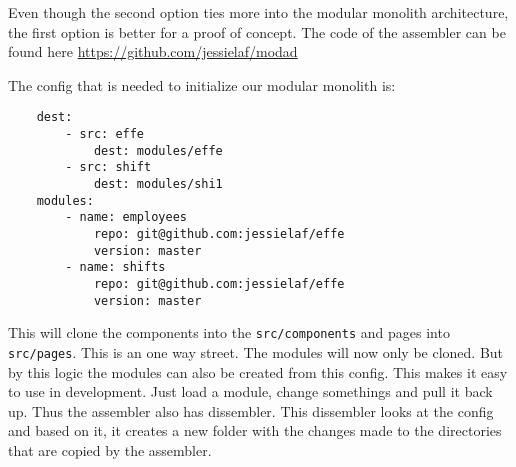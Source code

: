 Even though the second option ties more into the modular monolith architecture, the first option is better for a proof of concept. The code of the assembler can be found here \url{https://github.com/jessielaf/modad}

The config that is needed to initialize our modular monolith is:
\begin{verbatim}
    dest:
        - src: effe
            dest: modules/effe
        - src: shift
            dest: modules/shi1
    modules:
        - name: employees
            repo: git@github.com:jessielaf/effe
            version: master
        - name: shifts
            repo: git@github.com:jessielaf/effe
            version: master
\end{verbatim}

This will clone the components into the \texttt{src/components} and pages into \texttt{src/pages}. This is an one way street. The modules will now only be cloned. But by this logic the modules can also be created from this config. This makes it easy to use in development. Just load a module, change somethings and pull it back up. Thus the assembler also has dissembler. This dissembler looks at the config and based on it, it creates a new folder with the changes made to the directories that are copied by the assembler.
